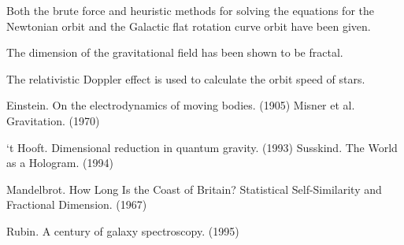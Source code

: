 \documentclass[12pt]{article}
\begin{document}
Both the brute force and heuristic methods for solving the equations for the Newtonian orbit and the Galactic flat rotation curve orbit have been given.

The dimension of the gravitational field has been shown to be fractal.

The relativistic Doppler effect is used to calculate the orbit speed of stars.



\pagebreak



\begin{thebibliography}{9}

 Einstein. On the electrodynamics of moving bodies. (1905)
 Misner et al. Gravitation. (1970)

 `t Hooft. Dimensional reduction in quantum gravity. (1993)
 Susskind. The World as a Hologram. (1994)

 Mandelbrot. How Long Is the Coast of Britain? Statistical Self-Similarity and Fractional Dimension. (1967)

 Rubin. A century of galaxy spectroscopy. (1995) 





\end{thebibliography}
\end{document}
